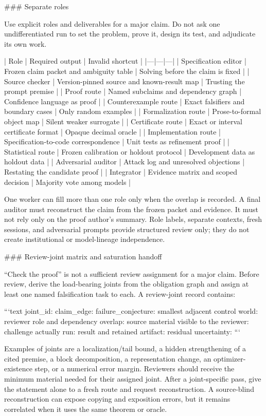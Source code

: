 \documentclass[11pt]{article}
\begin{document}
\begin{markdown}
### Separate roles

Use explicit roles and deliverables for a major claim. Do not ask one undifferentiated run to set
the problem, prove it, design its test, and adjudicate its own work.

| Role | Required output | Invalid shortcut |
|---|---|---|
| Specification editor | Frozen claim packet and ambiguity table | Solving before the claim is fixed |
| Source checker | Version-pinned source and known-result map | Trusting the prompt premise |
| Proof route | Named subclaims and dependency graph | Confidence language as proof |
| Counterexample route | Exact falsifiers and boundary cases | Only random examples |
| Formalization route | Prose-to-formal object map | Silent weaker surrogate |
| Certificate route | Exact or interval certificate format | Opaque decimal oracle |
| Implementation route | Specification-to-code correspondence | Unit tests as refinement proof |
| Statistical route | Frozen calibration or holdout protocol | Development data as holdout data |
| Adversarial auditor | Attack log and unresolved objections | Restating the candidate proof |
| Integrator | Evidence matrix and scoped decision | Majority vote among models |

One worker can fill more than one role only when the overlap is recorded. A final auditor must
reconstruct the claim from the frozen packet and evidence. It must not rely only on the proof
author's summary. Role labels, separate contexts, fresh sessions, and adversarial prompts provide
structured review only; they do not create institutional or model-lineage independence.

### Review-joint matrix and saturation handoff

“Check the proof” is not a sufficient review assignment for a major claim. Before review, derive
the load-bearing joints from the obligation graph and assign at least one named falsification task
to each. A review-joint record contains:

```text
joint_id:
claim_edge:
failure_conjecture:
smallest adjacent control world:
reviewer role and dependency overlap:
source material visible to the reviewer:
challenge actually run:
result and retained artifact:
residual uncertainty:
```

Examples of joints are a localization/tail bound, a hidden strengthening of a cited premise, a
block decomposition, a representation change, an optimizer-existence step, or a numerical error
margin. Reviewers should receive the minimum material needed for their assigned joint. After a
joint-specific pass, give the statement alone to a fresh route and request reconstruction. A
source-blind reconstruction can expose copying and exposition errors, but it remains correlated
when it uses the same theorem or oracle.


\end{markdown}
\end{document}
